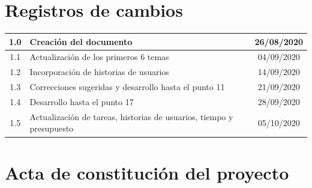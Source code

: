 \documentclass[11pt]{charter}
\begin{document}
\maketitle
\thispagestyle{empty}
\pagebreak


\section{Registros de cambios}
\label{sec:registro}


\begin{table}[ht]
\label{tab:registro}
\centering
\begin{tabularx}{\linewidth}{@{}|c|X|c|@{}}
\hline
\rowcolor[HTML]{418ddc} 
1.0      & Creación del documento                                          & 26/08/2020 \\ \hline
1.1      & Actualización de los primeros 6 temas                           & 04/09/2020 \\ \hline
1.2      & Incorporación de historias de usuarios                          & 14/09/2020 \\ \hline
1.3      & Correcciones sugeridas y desarrollo hasta el punto 11           & 21/09/2020 \\ \hline
1.4      & Desarrollo hasta el punto 17                           		   & 28/09/2020 \\ \hline
1.5      & Actualización de tareas, historias de usuarios, tiempo y presupuesto   & 05/10/2020 \\ \hline
\end{tabularx}
\end{table}

\pagebreak


\section{Acta de constitución del proyecto}
\label{sec:acta}
\end{document}
